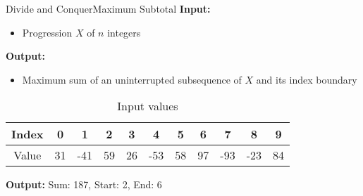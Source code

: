 \begin{frame}{Divide and Conquer}{Maximum Subtotal}
  \textbf{Input:}
  \begin{itemize}
    \item
      Progression {\color{Mittel-Blau}$X$} of {\color{Mittel-Blau}$n$} integers
  \end{itemize}
  \textbf{Output:}
  \begin{itemize}
    \item
      Maximum sum of an uninterrupted subsequence of {\color{Mittel-Blau}$X$} and its index boundary
  \end{itemize}
     \vspace{-1em}
    \begin{table}[!t]
      \caption{Input values}
      \begin{tabular}{c|c|c|c|c|c|c|c|c|c|c}
        Index & 0 & 1 & 2 & 3 & 4 & 5 & 6 & 7 & 8 & 9\\
        \midrule
        Value & 31 & -41 & 59 & 26 & -53 & 58 & 97 & -93 & -23 & 84
      \end{tabular}
      \label{tab:divide_and_conquer:max_subtotal_example_values}
    \end{table}
    \vspace{1em}
    \textbf{Output:} Sum: 187, Start: 2, End: 6
\end{frame}



